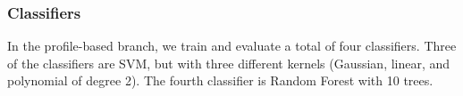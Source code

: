 \subsubsection{Classifiers}
In the profile-based branch, we train and evaluate a total of four classifiers. Three of the classifiers are SVM, but with three different kernels (Gaussian, linear, and polynomial of degree 2). The fourth classifier is Random Forest with 10 trees.

